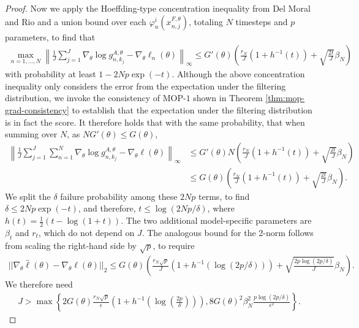 \begin{proof}
Now we apply the Hoeffding-type concentration inequality from Del Moral and Rio \cite{delMoral11} and a union bound over each $\varphi_n^i(x_{n,j}^{F,\theta})$, totaling $N$ timesteps and $p$ parameters, to find that
\begin{align}
    \max_{n=1,...,N} \left\lVert\frac{1}{J}\sum_{j=1}^J\nabla_\theta \log g_{n,k_j}^{A,\theta} - \nabla_\theta \ell_n(\theta) \right\rVert_{\infty} \leq G'(\theta)\left(\frac{r_N}{J}(1+h^{-1}(t)) + \sqrt{\frac{2t}{J}}\beta_N \right)
\end{align}
with probability at least $1-2Np\exp(-t)$. Although the above concentration inequality only considers the error from the expectation under the filtering distribution, we invoke the consistency of MOP-$1$ shown in Theorem \ref{thm:mop-grad-consistency} to establish that the expectation under the filtering distribution is in fact the score. It therefore holds that with the same probability, that when summing over $N$, as $NG'(\theta) \leq G(\theta)$, 
\begin{align}
    \left\lVert\frac{1}{J}\sum_{j=1}^J\sum_{n=1}^N\nabla_\theta \log g_{n,k_j}^{A,\theta} - \nabla_\theta \ell(\theta) \right\rVert_{\infty} 
    &\leq G'(\theta)N\left(\frac{r_N}{J}(1+h^{-1}(t)) + \sqrt{\frac{2t}{J}}\beta_N \right)\\
    &\leq G(\theta)\left(\frac{r_N}{J}(1+h^{-1}(t)) + \sqrt{\frac{2t}{J}}\beta_N \right).
\end{align}
We split the $\delta$ failure probability among these $2Np$ terms, to find $\delta\leq2Np\exp(-t)$, and therefore, $t\leq\log(2Np/\delta)$, where $h(t) = \frac{1}{2}(t - \log(1+t))$. 
The two additional model-specific parameters are $\beta_t$ and $r_t$, which do not depend on $J$. 
The analogous bound for the 2-norm follows from scaling the right-hand side by $\sqrt{p}$, to require 
\begin{align}
    ||\nabla_\theta \hat\ell(\theta) - \nabla_\theta \ell(\theta)||_2 \leq G(\theta)\left(\frac{r_N\sqrt{p}}{J}(1+h^{-1}(\log(2p/\delta))) + \sqrt{\frac{2p\log(2p/\delta)}{J}}\beta_N\right).
\end{align}
We therefore need 
\begin{align}
    J > \max\left\{2G(\theta)\frac{r_N\sqrt{p}}{\epsilon}\left(1+h^{-1}\left(\log\left(\frac{2p}{\delta}\right)\right)\right), 8G(\theta)^2\beta_N^2\frac{p\log(2p/\delta)}{\epsilon^2}\right\}.
\end{align}

\end{proof}


